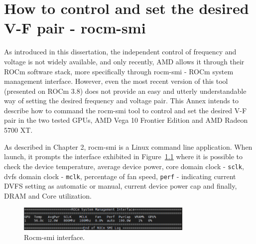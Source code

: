 
\chapter{How to control and set the desired V-F pair - rocm-smi}
\label{chapter:appendixRocm-smi}

As introduced in this dissertation, the independent control of frequency and voltage is not widely available, and only recently, AMD allows it through their ROCm software stack, more specifically through rocm-smi - ROCm system management interface. However, even the most recent version of this tool (presented on ROCm 3.8) does not provide an easy and utterly understandable way of setting the desired frequency and voltage pair. This Annex intends to describe how to command the rocm-smi tool to control and set the desired V-F pair in the two tested GPUs, AMD Vega 10 Frontier Edition and AMD Radeon 5700 XT.

As described in Chapter 2, rocm-smi is a Linux command line application. When launch, it prompts the interface exhibited in Figure~\ref{fig:rocm-smi} where it is possible to check the device temperature, average device power, core domain clock - \texttt{sclk}, \acrshort{dvfs} domain clock - \texttt{mclk}, percentage of fan speed, \texttt{perf} - indicating current DVFS setting as automatic or manual, current device power cap and finally, DRAM and Core utilization.

\begin{figure}[htb]
    \centering
\includegraphics[width=0.75\textwidth]{Figures/AnnexA/rocm-smi.png}
        \caption{Rocm-smi interface.}
    \label{fig:rocm-smi}
\end{figure}


